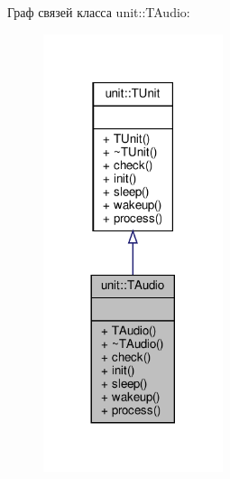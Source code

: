 Граф связей класса unit\+:\+:T\+Audio\+:\nopagebreak
\begin{figure}[H]
\begin{center}
\leavevmode
\includegraphics[width=149pt]{classunit_1_1_t_audio__coll__graph}
\end{center}
\end{figure}
